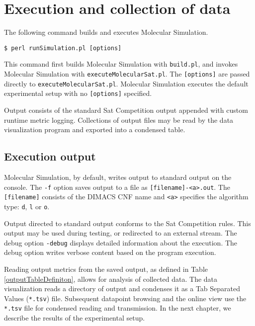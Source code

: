 	\section{Execution and collection of data}


The following command builds and executes Molecular Simulation.

\begin{center}
\texttt{\$ perl runSimulation.pl [options]}
\end{center}

This command first builds Molecular Simulation with \texttt{build.pl}, and invokes Molecular Simulation with \texttt{executeMolecularSat.pl}.  The \texttt{[options]} are passed directly to \texttt{executeMolecularSat.pl}.  Molecular Simulation executes the default experimental setup with no \texttt{[options]} specified.

Output consists of the standard {\sc Sat} Competition output appended with custom runtime metric logging.  Collections of output files may be read by the data visualization program and exported into a condensed table. 

		\subsection{Execution output}


	Molecular Simulation, by default, writes output to standard output on the console.  The \texttt{-f} option saves output to a file as \texttt{[filename]-<a>.out}.  The \texttt{[filename]} consists of the DIMACS CNF name and \texttt{<a>} specifies the algorithm type: \texttt{d}, \texttt{l} or \texttt{o}.

	Output directed to standard output conforms to the {\sc Sat} Competition rules.  This output may be used during testing, or redirected to an external stream.  The debug option \texttt{-debug} displays detailed information about the execution.  The debug option writes verbose content based on the program execution.  

	Reading output metrics from the saved output, as defined in Table \ref{outputTableDefiniton}, allows for analysis of collected data.  The data visualization reads a directory of output and condenses it as a Tab Separated Values (\texttt{*.tsv}) file.  Subsequent datapoint browsing and the online view use the \texttt{*.tsv} file for condensed reading and transmission.  In the next chapter, we describe the results of the experimental setup.
